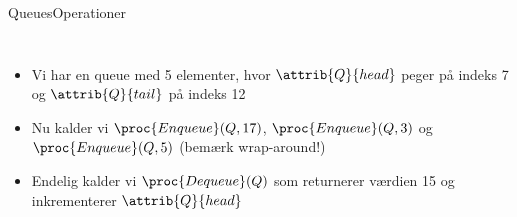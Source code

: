 \documentclass[aspectratio=1610]{beamer}
\begin{document}
\begin{frame}{Queues}{Operationer}
    \begin{columns}
        \begin{minipage}{\textwidth}
            \scriptsize

        \end{minipage}
    
        \begin{itemize}
            \footnotesize
            \item<3-> Vi har en queue med 5 elementer, hvor $\attrib{Q}{head}$ peger
                på indeks 7 og $\attrib{Q}{tail}$ på indeks 12
            \item<4-> Nu kalder vi $\proc{Enqueue}(Q,17)$, $\proc{Enqueue}(Q,3)$ og
                $\proc{Enqueue}(Q,5)$ (bemærk \alert{wrap-around}!)
            \item<5-> Endelig kalder vi $\proc{Dequeue}(Q)$ som returnerer værdien
                15 og inkrementerer $\attrib{Q}{head}$
        \end{itemize}


\end{columns}
\end{frame}
\end{document}
